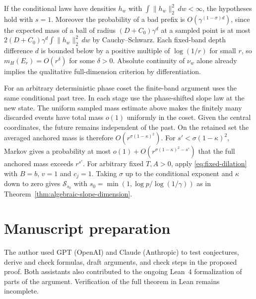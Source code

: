 \documentclass[11pt,a4paper]{article}
\begin{document}
If the conditional laws have densities $h_w$ with
$\int\|h_w\|_2^2\,dw<\infty$, the hypotheses hold with $s=1$.
Moreover the probability of a bad prefix is
$O(\gamma^{(1-\sigma)d})$, since the expected mass of a ball of
radius $(D+C_0)\gamma^d$ at a sampled point is at most
$2(D+C_0)\gamma^d\int\|h_w\|_2^2\,dw$ by Cauchy--Schwarz.
Each fixed-band depth difference $d$ is bounded below by a positive
multiple of $\log(1/r)$ for small $r$, so $m_H(E_r)=O(r^\delta)$
for some $\delta>0$. Absolute continuity of $\nu_w$ alone already
implies the qualitative full-dimension criterion by differentiation.


For an arbitrary deterministic phase coset the finite-band argument uses the same conditional past tree. In each stage use the phase-shifted slope law at the new state. The uniform sampled mass estimate above makes the finitely many discarded events have total mass $o(1)$ uniformly in the coset. Given the central coordinates, the future remains independent of the past. On the retained set the averaged anchored mass is therefore $O(r^{\sigma(1-\kappa)^2})$. For $s'<\sigma(1-\kappa)^2$, Markov gives a probability at most $o(1)+O(r^{\sigma(1-\kappa)^2-s'})$ that the full anchored mass exceeds $r^{s'}$. For arbitrary fixed $T,A>0$, apply \eqref{eq:fixed-dilation} with
$B=b$, $v=1$ and $c_j=1$. Taking $\sigma$ up to the conditional
exponent and $\kappa$ down to zero gives $\mathcal S_{s_0}$ with $s_0=\min(1,\log p/\log(1/\gamma))$ as in Theorem~\ref{thm:algebraic-slope-dimension}.


\section*{Manuscript preparation}
The author used GPT (OpenAI) and Claude (Anthropic) to test conjectures,
derive and check formulas, draft arguments, and check steps in the proposed
proof. Both assistants also contributed to the ongoing Lean~4 formalization
of parts of the argument. Verification of the full theorem in Lean remains
incomplete.
\end{document}
